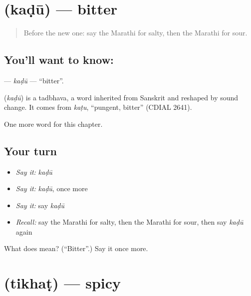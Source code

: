 \section[\texorpdfstring{\mr{कडू} (kaḍū)}{कडू (kaḍū)}]{ (kaḍū) — bitter}

\label{lesson:MR-C149-kadu}



\begin{quote}
Before the new one: say the Marathi for salty, then the Marathi for sour.
\end{quote}

\subsection*{You'll want to know: }
\textbf{} — \emph{kaḍū} — \textquotedblleft{}bitter\textquotedblright{}.

\begin{cousinweb}
\textbf{} (\emph{kaḍū}) is a tadbhava, a word inherited from Sanskrit and reshaped by sound change. It comes from \emph{kaṭu}, \textquotedblleft{}pungent, bitter\textquotedblright{} (CDIAL 2641).
\end{cousinweb}

\begin{grammarlens}[title={What you've built}]
One more word for this chapter.
\end{grammarlens}

\subsection*{Your turn}
\begin{itemize}
\raggedright
  \item \emph{Say it:} \emph{kaḍū}
  \item \emph{Say it:} \emph{kaḍū}, once more
  \item \emph{Say it:} say \emph{kaḍū}
  \item \emph{Recall:} say the Marathi for salty, then the Marathi for sour, then say \emph{kaḍū} again
\end{itemize}

\begin{tcolorbox}[breakable,colback=teal!4,colframe=teal!35!black,title={Before you move on}]
What does  mean? (\textquotedblleft{}Bitter\textquotedblright{}.) Say it once more.
\end{tcolorbox}
\section[\texorpdfstring{\mr{तिखट} (tikhaṭ)}{तिखट (tikhaṭ)}]{ (tikhaṭ) — spicy}


